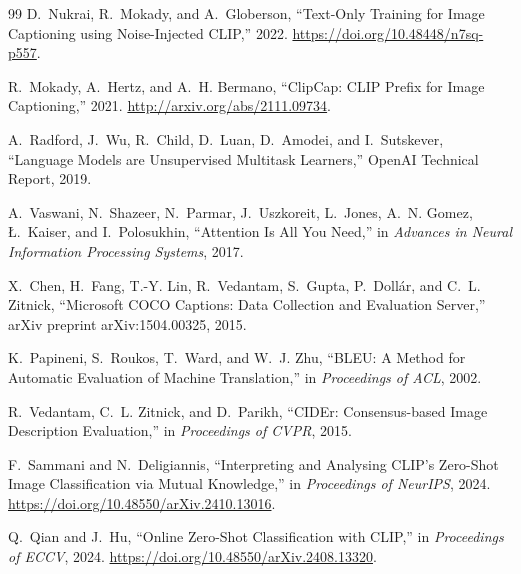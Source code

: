 \documentclass[10pt,twocolumn]{article}
\begin{document}
\begin{thebibliography}{99}
D.~Nukrai, R.~Mokady, and A.~Globerson, ``Text-Only Training for Image Captioning using Noise-Injected CLIP,'' 2022. \url{https://doi.org/10.48448/n7sq-p557}.

R.~Mokady, A.~Hertz, and A.~H. Bermano, ``ClipCap: CLIP Prefix for Image Captioning,'' 2021. \url{http://arxiv.org/abs/2111.09734}.

A.~Radford, J.~Wu, R.~Child, D.~Luan, D.~Amodei, and I.~Sutskever, ``Language Models are Unsupervised Multitask Learners,'' OpenAI Technical Report, 2019.

A.~Vaswani, N.~Shazeer, N.~Parmar, J.~Uszkoreit, L.~Jones, A.~N. Gomez, {\L}.~Kaiser, and I.~Polosukhin, ``Attention Is All You Need,'' in \emph{Advances in Neural Information Processing Systems}, 2017.

X.~Chen, H.~Fang, T.-Y. Lin, R.~Vedantam, S.~Gupta, P.~Doll{\'a}r, and C.~L. Zitnick, ``Microsoft COCO Captions: Data Collection and Evaluation Server,'' arXiv preprint arXiv:1504.00325, 2015.

K.~Papineni, S.~Roukos, T.~Ward, and W.~J. Zhu, ``BLEU: A Method for Automatic Evaluation of Machine Translation,'' in \emph{Proceedings of ACL}, 2002.

R.~Vedantam, C.~L. Zitnick, and D.~Parikh, ``CIDEr: Consensus-based Image Description Evaluation,'' in \emph{Proceedings of CVPR}, 2015.

F.~Sammani and N.~Deligiannis, ``Interpreting and Analysing CLIP's Zero-Shot Image Classification via Mutual Knowledge,'' in \emph{Proceedings of NeurIPS}, 2024. \url{https://doi.org/10.48550/arXiv.2410.13016}.

Q.~Qian and J.~Hu, ``Online Zero-Shot Classification with CLIP,'' in \emph{Proceedings of ECCV}, 2024. \url{https://doi.org/10.48550/arXiv.2408.13320}.
\end{thebibliography}
\end{document}
